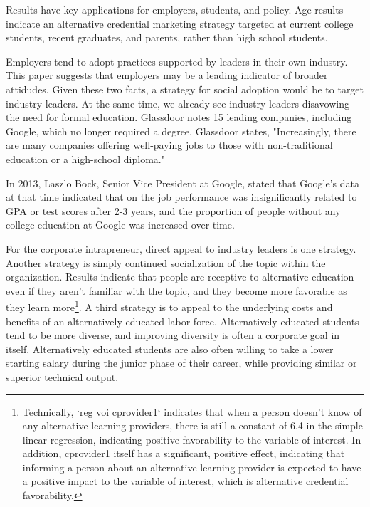 \documentclass[AER]{./aea-latex-templates/AEA}
\begin{document}
Results have key applications for employers, students, and policy.
Age results indicate an alternative credential marketing strategy targeted at
current college students, recent graduates, and parents, rather than high school students.

Employers tend to adopt practices supported by leaders in their own industry.
This paper suggests that employers may be a leading indicator of broader attidudes.
Given these two facts, a strategy for social adoption would be to target industry leaders.
At the same time, we already see industry leaders disavowing the need for formal education.
Glassdoor notes 15 leading companies, including Google, which no longer required a degree\cite{glassdoor_2018}. Glassdoor
states, "Increasingly, there are many companies offering well-paying jobs
to those with non-traditional education or a high-school diploma."

In 2013, Laszlo Bock, Senior Vice President at Google, stated that Google’s data at that time indicated
that on the job performance was insignificantly related to GPA or test
scores after 2-3 years, and the proportion of people without any college
education at Google was increased over time\cite{bryant_2013}.

For the corporate intrapreneur, direct appeal to industry leaders is one strategy.
Another strategy is simply continued socialization of the topic within the organization.
Results indicate that people are receptive to alternative education even if they aren’t
familiar with the topic, and they become more favorable as they learn
more\footnote{Technically, `reg voi cprovider1` indicates that when a person doesn’t know of any alternative learning providers, there is still a constant of 6.4 in the simple linear regression, indicating positive favorability to the variable of interest. In addition, cprovider1 itself has a significant, positive effect, indicating that informing a person about an alternative learning provider is expected to have a positive impact to the variable of interest, which is alternative credential favorability.}.
A third strategy is to appeal to the underlying costs and benefits of an alternatively educated labor force.
Alternatively educated students tend to be more diverse\cite{florentine_2018}, and improving diversity is often a corporate goal in itself.
Alternatively educated students are also often willing to take a lower starting salary during the junior phase of their career, while providing similar or superior technical output.
\end{document}

